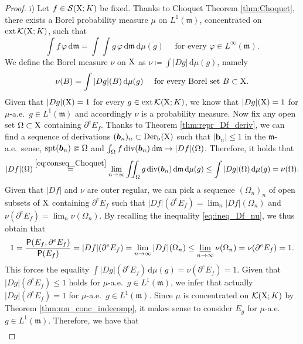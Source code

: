 \documentclass[reqno]{amsart}
\numberwithin{equation}{section}
\newcommand{\X}{{\rm X}}
\newcommand{\mm}{\mathfrak m}
\renewcommand{\d}{{\mathrm d}}
\newcommand{\1}{\mathbbm 1}
\newcommand{\limi}{\varliminf}
\renewcommand{\P}{{\sf P}}
\begin{document}
\begin{proof}
{\color{blue}i)} Let \(f\in\mathcal S(\X;K)\) be fixed. Thanks to Choquet Theorem
\ref{thm:Choquet}, there exists a Borel probability measure \(\mu\) on \(L^1(\mm)\),
concentrated on \({\rm ext}\,\mathcal K(\X;K)\), such that
\begin{equation}\label{eq:conseq_Choquet}
\int f\,\varphi\,\d\mm=\int\!\!\!\int g\,\varphi\,\d\mm\,\d\mu(g)
\quad\text{ for every }\varphi\in L^\infty(\mm).
\end{equation}
We define the Borel measure \(\nu\) on \(\X\) as \(\nu\coloneqq\int|Dg|\,\d\mu(g)\), namely
\[
\nu(B)=\int|Dg|(B)\,\d\mu(g)\quad\text{ for every Borel set }B\subset\X.
\]
Given that \(|Dg|(\X)=1\) for every \(g\in{\rm ext}\,\mathcal K(\X;K)\),
we know that \(|Dg|(\X)=1\) for \(\mu\)-a.e.\ \(g\in L^1(\mm)\) and
accordingly \(\nu\) is a probability measure. Now fix any open set \(\Omega\subset\X\)
containing \(\partial^e E_f\). Thanks to Theorem \ref{thm:repr_Df_deriv},
we can find a sequence of derivations \((\boldsymbol b_n)_n\subset{\rm Der}_{\rm b}(\X)\)
such that \(|\boldsymbol b_n|\leq 1\) in the \(\mm\)-a.e.\ sense,
\({\rm spt}(\boldsymbol b_n)\Subset\Omega\) and
\(\int_\Omega f\,{\rm div}(\boldsymbol b_n)\,\d\mm\to|Df|(\Omega)\). Therefore, it holds that
\begin{equation}\label{eq:ineq_Df_nu}
|Df|(\Omega)\overset{\eqref{eq:conseq_Choquet}}=
\lim_{n\to\infty}\int\!\!\!\int_\Omega g\,{\rm div}(\boldsymbol b_n)\,\d\mm\,\d\mu(g)
\leq\int|Dg|(\Omega)\,\d\mu(g)=\nu(\Omega).
\end{equation}
Given that \(|Df|\) and \(\nu\) are outer regular, we can pick a
sequence \((\Omega_n)_n\) of open subsets of \(\X\) containing
\(\partial^e E_f\) such that \(|Df|(\partial^e E_f)=\lim_n|Df|(\Omega_n)\)
and \(\nu(\partial^e E_f)=\lim_n\nu(\Omega_n)\). By recalling the inequality
\eqref{eq:ineq_Df_nu}, we thus obtain that
\[
1=\frac{\P(E_f,\partial^e E_f)}{\P(E_f)}=|Df|(\partial^e E_f)=
\lim_{n\to\infty}|Df|(\Omega_n)\leq\limi_{n\to\infty}\nu(\Omega_n)=\nu(\partial^e E_f)=1.
\]
This forces the equality \(\int|Dg|(\partial^e E_f)\,\d\mu(g)=\nu(\partial^e E_f)=1\).
Given that \(|Dg|(\partial^e E_f)\leq 1\) holds for \(\mu\)-a.e.\ \(g\in L^1(\mm)\),
we infer that actually \(|Dg|(\partial^e E_f)=1\) for \(\mu\)-a.e.\ \(g\in L^1(\mm)\).
Since \(\mu\) is concentrated on \({\mathcal K}(\X;K)\) by Theorem \ref{thm:mu_conc_indecomp},
it makes sense to consider \(E_g\) for \(\mu\)-a.e.\ \(g\in L^1(\mm)\). Therefore,
we have that
\[\begin{split}

\end{split}\]
\end{proof}
\end{document}
